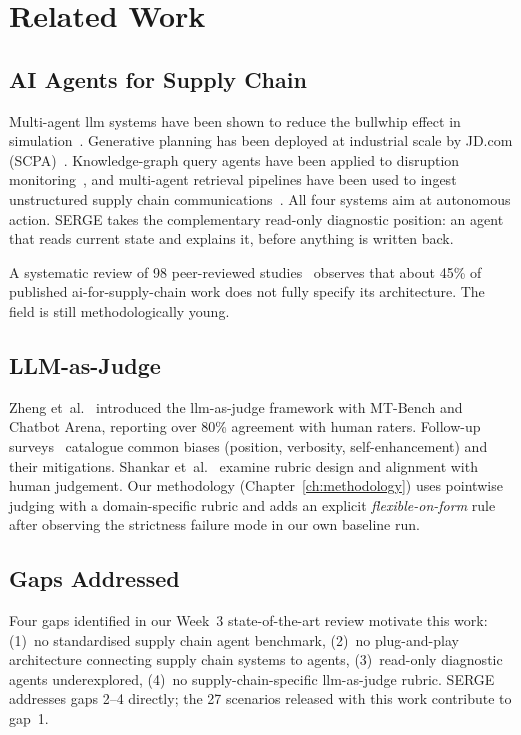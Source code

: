 
\chapter{Related Work}
\label{ch:relwork}

\section{AI Agents for Supply Chain}

Multi-agent \gls{llm} systems have been shown to reduce the bullwhip effect in simulation~\cite{jannelli2024agentic}. Generative planning has been deployed at industrial scale by JD.com (SCPA)~\cite{yin2025scpa}. Knowledge-graph query agents have been applied to disruption monitoring~\cite{almahri2026disruption}, and multi-agent retrieval pipelines have been used to ingest unstructured supply chain communications~\cite{zhang2025rag}. All four systems aim at autonomous action. SERGE takes the complementary read-only diagnostic position: an agent that reads current state and explains it, before anything is written back.

A systematic review of 98 peer-reviewed studies~\cite{gaisc2025systematic} observes that about 45\% of published \gls{ai}-for-supply-chain work does not fully specify its architecture. The field is still methodologically young.

\section{LLM-as-Judge}

Zheng et~al.~\cite{zheng2023judge} introduced the \gls{llm}-as-judge framework with MT-Bench and Chatbot Arena, reporting over 80\% agreement with human raters. Follow-up surveys~\cite{gu2024judgesurvey,li2024judgessurvey} catalogue common biases (position, verbosity, self-enhancement) and their mitigations. Shankar et~al.~\cite{shankar2024validators} examine rubric design and alignment with human judgement. Our methodology (Chapter~\ref{ch:methodology}) uses pointwise judging with a domain-specific rubric and adds an explicit \emph{flexible-on-form} rule after observing the strictness failure mode in our own baseline run.

\section{Gaps Addressed}

Four gaps identified in our Week~3 state-of-the-art review motivate this work: (1)~no standardised supply chain agent benchmark, (2)~no plug-and-play architecture connecting supply chain systems to agents, (3)~read-only diagnostic agents underexplored, (4)~no supply-chain-specific \gls{llm}-as-judge rubric. SERGE addresses gaps 2--4 directly; the 27 scenarios released with this work contribute to gap~1.
